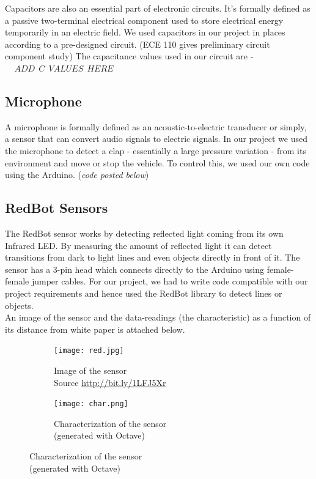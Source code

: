 \documentclass[12pt,a4paper]{article}
\begin{document}
\begin{large}
Capacitors are also an essential part of electronic circuits. It's formally defined as a passive two-terminal electrical component used to store electrical energy temporarily in an electric field. We used capacitors in our project in places according to a pre-designed circuit. (ECE 110 gives preliminary circuit component study) The capacitance values used in our circuit are - $~~~~~ADD ~~C~~ VALUES ~~HERE~~~~$

\subsection{Microphone}

A microphone is formally defined as an acoustic-to-electric transducer or simply, a sensor that can convert audio signals to electric signals. In our project we used the microphone to detect a clap - essentially a large pressure variation - from its environment and move or stop the vehicle. To control this, we used our own code using the Arduino. (\textit{code posted below})
\subsection{RedBot Sensors}

The RedBot sensor works by detecting reflected light coming from its own Infrared LED. By measuring the amount of reflected light it can detect transitions from dark to light lines and even objects directly in front of it. The sensor has a 3-pin head which connects directly to the Arduino using female-female jumper cables. For our project, we had to write code compatible with our project requirements and hence used the RedBot library to detect lines or objects. \\

An image of the sensor and the data-readings (the characteristic) as a function of its distance from white paper is attached below. 

\begin{figure} [hbp]
\centering
  \begin{subfigure}[b]{0.4\textwidth}
  \centering
  \captionsetup{justification=centering}
    \texttt{[image: red.jpg]}
    \caption{Image of the sensor \\Source \protect\url{http://bit.ly/1LFJ5Xr}}
   
  \end{subfigure}
  \hspace{1cm}
  \begin{subfigure}[b]{0.4\textwidth}
  \centering
  \captionsetup{justification=centering}
    \texttt{[image: char.png]}
    \caption{Characterization of the sensor \\(generated with Octave)}
    

\end{subfigure}
\end{figure}
\end{large}
\end{document}
